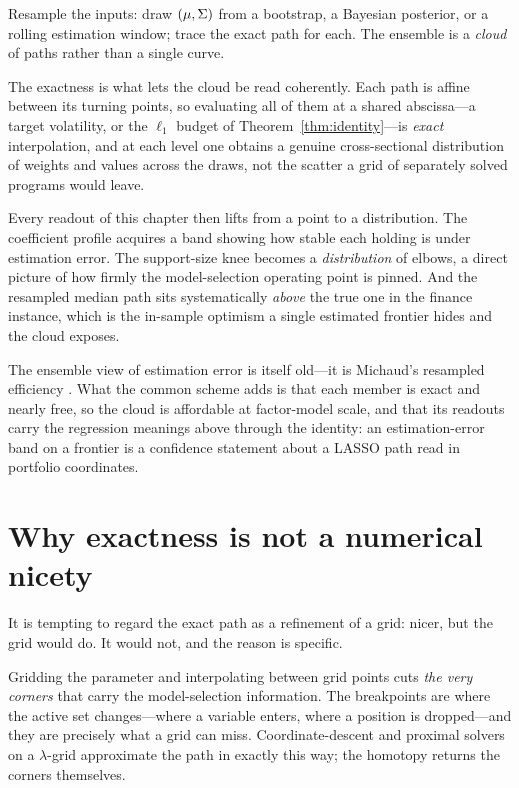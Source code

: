 Resample the inputs: draw $(\mu,\Sigma)$ from a bootstrap, a Bayesian posterior, or a
rolling estimation window; trace the exact path for each. The ensemble is a
\emph{cloud} of paths rather than a single curve.

The exactness is what lets the cloud be read coherently. Each path is affine between
its turning points, so evaluating all of them at a shared abscissa---a target
volatility, or the $\ell_1$ budget of Theorem~\ref{thm:identity}---is \emph{exact}
interpolation, and at each level one obtains a genuine cross-sectional distribution of
weights and values across the draws, not the scatter a grid of separately solved
programs would leave.

Every readout of this chapter then lifts from a point to a distribution. The
coefficient profile acquires a band showing how stable each holding is under
estimation error. The support-size knee becomes a \emph{distribution} of elbows, a
direct picture of how firmly the model-selection operating point is pinned. And the
resampled median path sits systematically \emph{above} the true one in the finance
instance, which is the in-sample optimism a single estimated frontier hides and the
cloud exposes.

The ensemble view of estimation error is itself old---it is Michaud's resampled
efficiency \cite{michaud1999}. What the common scheme adds is that each member is
exact and nearly free, so the cloud is affordable at factor-model scale, and that its
readouts carry the regression meanings above through the identity: an estimation-error
band on a frontier is a confidence statement about a LASSO path read in portfolio
coordinates.

\section{Why exactness is not a numerical nicety}

It is tempting to regard the exact path as a refinement of a grid: nicer, but the
grid would do. It would not, and the reason is specific.

Gridding the parameter and interpolating between grid points cuts \emph{the very
corners} that carry the model-selection information. The breakpoints are where the
active set changes---where a variable enters, where a position is dropped---and they
are precisely what a grid can miss. Coordinate-descent and proximal solvers on a
$\lambda$-grid approximate the path in exactly this way; the homotopy returns the
corners themselves.

